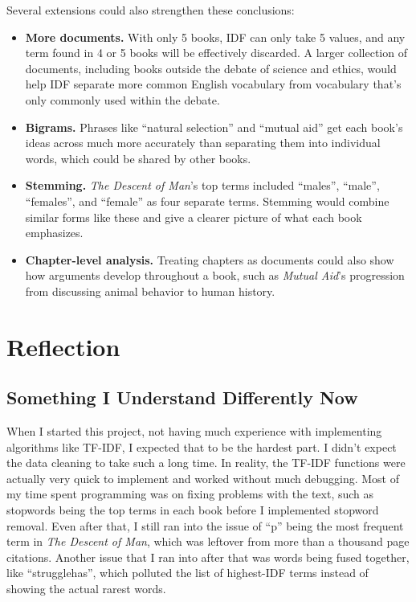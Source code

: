 \documentclass[11pt]{article}
\begin{document}
Several extensions could also strengthen these conclusions:
\begin{itemize}
    \item \textbf{More documents.} With only 5 books, IDF can only take 5 values, and any term found in 4 or 5 books will be effectively discarded.
    A larger collection of documents, including books outside the debate of science and ethics, would help IDF separate more common English vocabulary from vocabulary that's only commonly used within the debate.
    \item \textbf{Bigrams.} Phrases like ``natural selection'' and ``mutual aid'' get each book's ideas across much more accurately than separating them into individual words, which could be shared by other books.
    \item \textbf{Stemming.} \emph{The Descent of Man}'s top terms included ``males'', ``male'', ``females'', and ``female'' as four separate terms.
    Stemming would combine similar forms like these and give a clearer picture of what each book emphasizes.
    \item \textbf{Chapter-level analysis.} Treating chapters as documents could also show how arguments develop throughout a book, such as \emph{Mutual Aid}'s progression from discussing animal behavior to human history.
\end{itemize}

\section{Reflection}
\label{sec:reflection}

\subsection{Something I Understand Differently Now}

When I started this project, not having much experience with implementing algorithms like TF-IDF, I expected that to be the hardest part.
I didn't expect the data cleaning to take such a long time.
In reality, the TF-IDF functions were actually very quick to implement and worked without much debugging.
Most of my time spent programming was on fixing problems with the text, such as stopwords being the top terms in each book before I implemented stopword removal.
Even after that, I still ran into the issue of ``p'' being the most frequent term in \emph{The Descent of Man}, which was leftover from more than a thousand page citations.
Another issue that I ran into after that was words being fused together, like ``strugglehas'', which polluted the list of highest-IDF terms instead of showing the actual rarest words.
\end{document}
